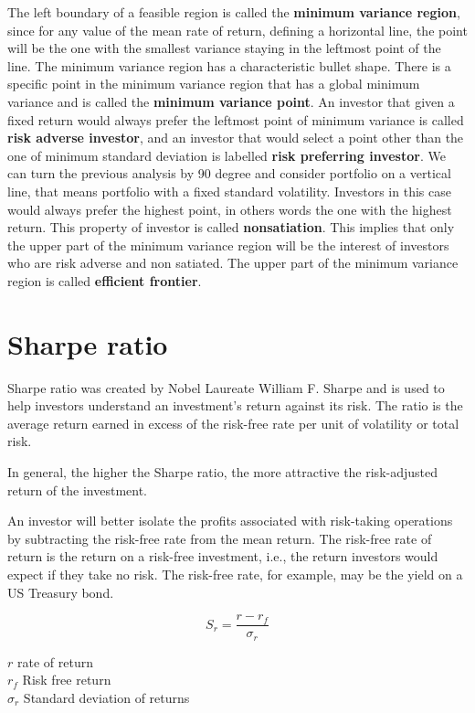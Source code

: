 \hfill \break

The left boundary of a feasible region is called the \textbf{minimum variance region}, since for any value of the mean rate of return, defining a horizontal line, the point will be the one with the smallest variance staying in the leftmost point of the line.
The minimum variance region has a characteristic bullet shape. There is a specific point in the minimum variance region that has a global minimum variance and is called the \textbf{minimum variance point}.
An investor that given a fixed return would always prefer the leftmost point of minimum variance is called \textbf{risk adverse investor}, and an investor that would select a point other than the one of minimum standard deviation is labelled \textbf{risk preferring investor}. We can turn the previous analysis by 90 degree and consider portfolio on a vertical line, that means portfolio with a fixed standard volatility. Investors in this case would always prefer the highest point, in others words the one with the highest return. This property of investor is called \textbf{nonsatiation}. This implies that only the upper part of the minimum variance region will be the interest of investors who are risk adverse and non satiated. The upper part of the minimum variance region is called \textbf{efficient frontier}.  

\section{Sharpe ratio}
\label{s:sharpe_ratio}

Sharpe ratio was created by Nobel Laureate William F. Sharpe and is used to help investors understand an investment's return against its risk.
The ratio is the average return earned in excess of the risk-free rate per unit of volatility or total risk.

In general, the higher the Sharpe ratio, the more attractive the risk-adjusted return of the investment. 

An investor will better isolate the profits associated with risk-taking operations by subtracting the risk-free rate from the mean return.
The risk-free rate of return is the return on a risk-free investment, i.e., the return investors would expect if they take no risk.
The risk-free rate, for example, may be the yield on a US Treasury bond. 


$$ S_r = \frac{r - r_f}{\sigma_r}$$

$r$ rate of return \\
$r_f$ Risk free return \\
$\sigma_r$ Standard deviation of returns

